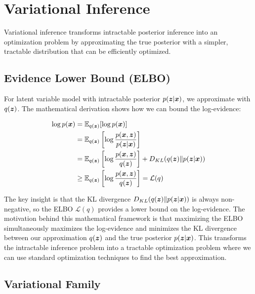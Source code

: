 
\section{Variational Inference }
\label{sec:variational-inference}

Variational inference transforms intractable posterior inference into an optimization problem by approximating the true posterior with a simpler, tractable distribution that can be efficiently optimized.

\subsection{Evidence Lower Bound (ELBO)}

For latent variable model with intractable posterior $p(\boldsymbol{z}|\boldsymbol{x})$, we approximate with $q(\boldsymbol{z})$. The mathematical derivation shows how we can bound the log-evidence:

\begin{align}
\log p(\boldsymbol{x}) &= \mathbb{E}_{q(\boldsymbol{z})}[\log p(\boldsymbol{x})] \\
&= \mathbb{E}_{q(\boldsymbol{z})}\left[\log \frac{p(\boldsymbol{x}, \boldsymbol{z})}{p(\boldsymbol{z}|\boldsymbol{x})}\right] \\
&= \mathbb{E}_{q(\boldsymbol{z})}\left[\log \frac{p(\boldsymbol{x}, \boldsymbol{z})}{q(\boldsymbol{z})}\right] + D_{KL}(q(\boldsymbol{z}) \| p(\boldsymbol{z}|\boldsymbol{x})) \\
&\geq \mathbb{E}_{q(\boldsymbol{z})}\left[\log \frac{p(\boldsymbol{x}, \boldsymbol{z})}{q(\boldsymbol{z})}\right] = \mathcal{L}(q)
\end{align}

The key insight is that the KL divergence $D_{KL}(q(\boldsymbol{z}) \| p(\boldsymbol{z}|\boldsymbol{x}))$ is always non-negative, so the ELBO $\mathcal{L}(q)$ provides a lower bound on the log-evidence. The motivation behind this mathematical framework is that maximizing the ELBO simultaneously maximizes the log-evidence and minimizes the KL divergence between our approximation $q(\boldsymbol{z})$ and the true posterior $p(\boldsymbol{z}|\boldsymbol{x})$. This transforms the intractable inference problem into a tractable optimization problem where we can use standard optimization techniques to find the best approximation.

\subsection{Variational Family}


